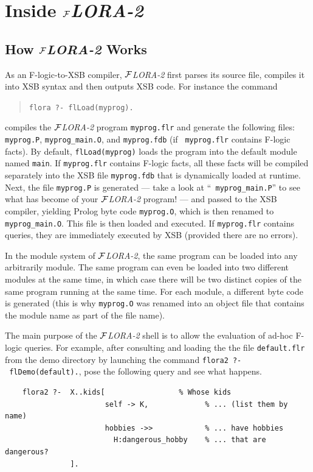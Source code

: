 \documentclass[11pt]{article}
\newcommand{\FLORA}{{\mbox{${\cal F}${\small\it LORA}\rm\emph{-2}}}\xspace}
\newcommand{\fl}{\mbox{F-logic}\xspace}
\begin{document}
\appendix

\section{Inside \FLORA}

\subsection{How \FLORA Works}


As an \fl-to-XSB compiler, \FLORA first parses its source file,
compiles it into XSB syntax and then outputs XSB code. For instance the command
\begin{quote}
\verb|flora ?- flLoad(myprog).|
\end{quote}
compiles the \FLORA program {\tt myprog.flr} and generate the following
files: {\tt myprog.P}, {\tt myprog\_main.O}, and {\tt myprog.fdb} (if {\tt
  myprog.flr} contains \fl facts).  By default, {\tt flLoad(myprog)} loads
the program into the default module named {\tt main}. If {\tt myprog.flr}
contains \fl facts, all these facts will be compiled separately into the
XSB file {\tt myprog.fdb} that is dynamically loaded at runtime.  Next, the
file {\tt myprog.P} is generated --- take a look at ``{\tt
  myprog\_main.P}'' to see what has become of your \FLORA program! --- and
passed to the XSB compiler, yielding Prolog byte code {\tt myprog.O}, which
is then renamed to {\tt myprog\_main.O}. This file is then loaded and
executed.  If {\tt myprog.flr} contains queries, they are immediately
executed by XSB (provided there are no errors).

In the module system of \FLORA, the same program can be loaded into any
arbitrarily module. The same program can even be loaded into two different
modules at the same time, in which case there will be two distinct copies
of the same program running at the same time. For each module, a different
byte code is generated (this is why {\tt myprog.O} was renamed into an
object file that contains the module name as part of the file name).

The main purpose of the \FLORA shell is to allow the evaluation
of ad-hoc \fl queries. For example, after consulting and loading the
the file \texttt{default.flr} from the demo directory by launching
the command \texttt{flora2~?-~flDemo(default).}, pose the following query
and see what happens.
\begin{verbatim}
    flora2 ?-  X..kids[                 % Whose kids
                       self -> K,             % ... (list them by name)
                       hobbies ->>            % ... have hobbies
                         H:dangerous_hobby    % ... that are dangerous?
               ]. 
\end{verbatim}
\end{document}
